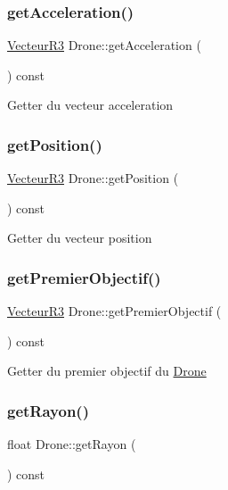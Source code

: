 \subsubsection{\texorpdfstring{get\+Acceleration()}{getAcceleration()}}
{\footnotesize\ttfamily \mbox{\hyperlink{class_vecteur_r3}{Vecteur\+R3}} Drone\+::get\+Acceleration (\begin{DoxyParamCaption}{ }\end{DoxyParamCaption}) const}

Getter du vecteur acceleration \mbox{\label{class_drone_a54d473991206bba12c44e5425779793e}} 
\subsubsection{\texorpdfstring{get\+Position()}{getPosition()}}
{\footnotesize\ttfamily \mbox{\hyperlink{class_vecteur_r3}{Vecteur\+R3}} Drone\+::get\+Position (\begin{DoxyParamCaption}{ }\end{DoxyParamCaption}) const}

Getter du vecteur position \mbox{\label{class_drone_ad8d5dda09c0e45c8d2c0f1f26a840f0e}} 
\subsubsection{\texorpdfstring{get\+Premier\+Objectif()}{getPremierObjectif()}}
{\footnotesize\ttfamily \mbox{\hyperlink{class_vecteur_r3}{Vecteur\+R3}} Drone\+::get\+Premier\+Objectif (\begin{DoxyParamCaption}{ }\end{DoxyParamCaption}) const}

Getter du premier objectif du \mbox{\hyperlink{class_drone}{Drone}} \mbox{\label{class_drone_a03a089698c78f9f4dedc51b5dc7099c3}} 
\subsubsection{\texorpdfstring{get\+Rayon()}{getRayon()}}
{\footnotesize\ttfamily float Drone\+::get\+Rayon (\begin{DoxyParamCaption}{ }\end{DoxyParamCaption}) const}

